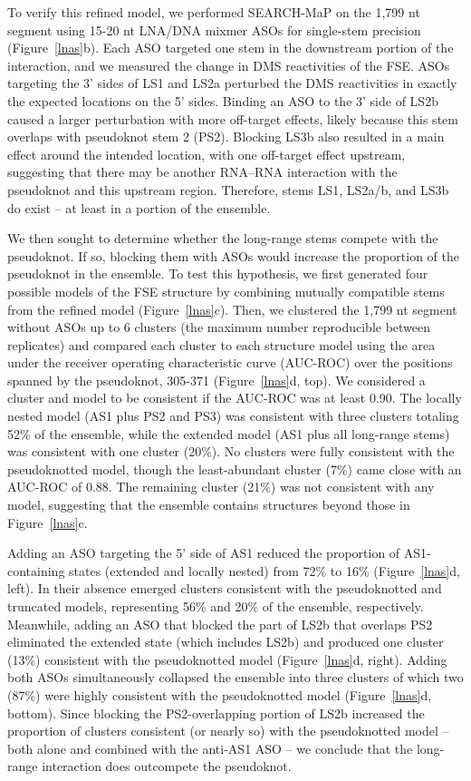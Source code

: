 \documentclass[main.tex]{subfiles}
\begin{document}
To verify this refined model, we performed SEARCH-MaP on the 1,799 nt segment using 15-20 nt LNA/DNA mixmer ASOs for single-stem precision (Figure~\ref{lnas}b).
Each ASO targeted one stem in the downstream portion of the interaction, and we measured the change in DMS reactivities of the FSE.
ASOs targeting the 3' sides of LS1 and LS2a perturbed the DMS reactivities in exactly the expected locations on the 5' sides.
Binding an ASO to the 3' side of LS2b caused a larger perturbation with more off-target effects, likely because this stem overlaps with pseudoknot stem 2 (PS2).
Blocking LS3b also resulted in a main effect around the intended location, with one off-target effect upstream, suggesting that there may be another RNA--RNA interaction with the pseudoknot and this upstream region.
Therefore, stems LS1, LS2a/b, and LS3b do exist -- at least in a portion of the ensemble.

We then sought to determine whether the long-range stems compete with the pseudoknot.
If so, blocking them with ASOs would increase the proportion of the pseudoknot in the ensemble.
To test this hypothesis, we first generated four possible models of the FSE structure by combining mutually compatible stems from the refined model (Figure~\ref{lnas}c).
Then, we clustered the 1,799 nt segment without ASOs up to 6 clusters (the maximum number reproducible between replicates) and compared each cluster to each structure model using the area under the receiver operating characteristic curve (AUC-ROC) over the positions spanned by the pseudoknot, 305-371 (Figure~\ref{lnas}d, top).
We considered a cluster and model to be consistent if the AUC-ROC was at least 0.90.
The locally nested model (AS1 plus PS2 and PS3) was consistent with three clusters totaling 52\% of the ensemble, while the extended model (AS1 plus all long-range stems) was consistent with one cluster (20\%).
No clusters were fully consistent with the pseudoknotted model, though the least-abundant cluster (7\%) came close with an AUC-ROC of 0.88.
The remaining cluster (21\%) was not consistent with any model, suggesting that the ensemble contains structures beyond those in Figure~\ref{lnas}c.

Adding an ASO targeting the 5' side of AS1 reduced the proportion of AS1-containing states (extended and locally nested) from 72\% to 16\% (Figure~\ref{lnas}d, left).
In their absence emerged clusters consistent with the pseudoknotted and truncated models, representing 56\% and 20\% of the ensemble, respectively.
Meanwhile, adding an ASO that blocked the part of LS2b that overlaps PS2 eliminated the extended state (which includes LS2b) and produced one cluster (13\%) consistent with the pseudoknotted model (Figure~\ref{lnas}d, right).
Adding both ASOs simultaneously collapsed the ensemble into three clusters of which two (87\%) were highly consistent with the pseudoknotted model (Figure~\ref{lnas}d, bottom).
Since blocking the PS2-overlapping portion of LS2b increased the proportion of clusters consistent (or nearly so) with the pseudoknotted model -- both alone and combined with the anti-AS1 ASO -- we conclude that the long-range interaction does outcompete the pseudoknot.
\end{document}
